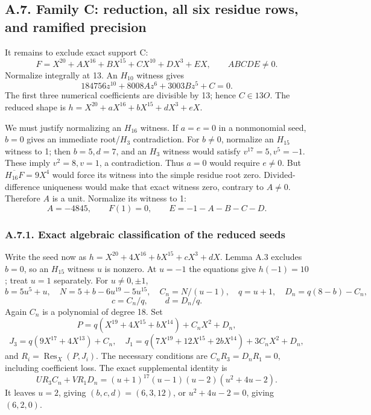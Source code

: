\documentclass[
  british,
  10pt,
  a4paper,
]{article}
\begin{document}
\subsection*{A.7. Family C: reduction, all six residue rows, and
ramified
precision}\label{a.7.-family-c-reduction-all-six-residue-rows-and-ramified-precision}

It remains to exclude exact support C: \[
F=X^{20}+AX^{16}+BX^{15}+CX^{10}+DX^3+EX,
\qquad ABCDE\ne0.
\tag{S14}
\] Normalize integrally at 13. An \(H_{10}\) witness gives \[
184756z^{10}+8008Az^6+3003Bz^5+C=0.
\] The first three numerical coefficients are divisible by 13; hence
\(C\in13O\). The reduced shape is \(h=X^{20}+aX^{16}+bX^{15}+dX^3+eX\).

We must justify normalizing an \(H_{16}\) witness. If \(a=e=0\) in a
nonmonomial seed, \(b=0\) gives an immediate root/\(H_3\) contradiction.
For \(b\ne0\), normalize an \(H_{15}\) witness to 1; then \(b=5,d=7\),
and an \(H_3\) witness would satisfy \(v^{17}=5,v^5=-1\). These imply
\(v^2=8,v=1\), a contradiction. Thus \(a=0\) would require \(e\ne0\).
But \(\overline{H_{16}F}=9X^4\) would force its witness into the simple
residue root zero. Divided-difference uniqueness would make that exact
witness zero, contrary to \(A\ne0\). Therefore \(A\) is a unit.
Normalize its witness to 1: \[
A=-4845,\qquad F(1)=0,\qquad E=-1-A-B-C-D.
\tag{S15}
\]

\subsubsection*{A.7.1. Exact algebraic classification of the reduced
seeds}\label{a.7.1.-exact-algebraic-classification-of-the-reduced-seeds}

Write the seed now as \(h=X^{20}+4X^{16}+bX^{15}+cX^3+dX\). Lemma A.3
excludes \(b=0\), so an \(H_{15}\) witness \(u\) is nonzero. At \(u=-1\)
the equations give \(h(-1)=10\); treat \(u=1\) separately. For
\(u\ne0,\pm1\), \[
b=5u^5+u,\quad N=5+b-6u^{19}-5u^{15},\quad
C_n=N/(u-1),\quad q=u+1,\quad D_n=q(8-b)-C_n,
\] \[
c=C_n/q,\qquad d=D_n/q.
\] Again \(C_n\) is a polynomial of degree 18. Set \[
P=q(X^{19}+4X^{15}+bX^{14})+C_nX^2+D_n,
\] \[
J_3=q(9X^{17}+4X^{13})+C_n,\quad
J_1=q(7X^{19}+12X^{15}+2bX^{14})+3C_nX^2+D_n,
\] and \(R_i=\operatorname{Res}_X(P,J_i)\). The necessary conditions are
\(C_nR_3=D_nR_1=0\), including coefficient loss. The exact supplemental
identity is \[
UR_3C_n+VR_1D_n=(u+1)^{17}(u-1)(u-2)(u^2+4u-2).
\tag{S16}
\] It leaves \(u=2\), giving \((b,c,d)=(6,3,12)\), or \(u^2+4u-2=0\),
giving \((6,2,0)\).
\end{document}
